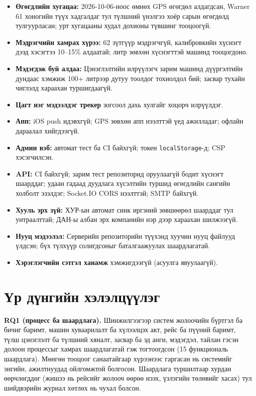 \documentclass[
12pt,
oneside,
english,
onehalfspacing,
nolistspacing,
headsepline,
]{MUST-Thesis}
\begin{document}
\begin{itemize}
    \item \textbf{Өгөгдлийн хугацаа:} 2026-10-06-ноос өмнөх GPS өгөгдөл алдагдсан, Warner 61 хоногийн түүх хадгалдаг тул түлшний үнэлгээ хоёр сарын өгөгдөлд тулгуурласан; урт хугацааны худал дохионы түвшинг тооцоогүй.
    \item \textbf{Мэдрэгчийн хамрах хүрээ:} 62 зүтгүүр мэдрэгчгүй, калибровкийн хүснэгт дээд хэсэгтээ 10--15\% алдаатай; литр зөвхөн хүснэгттэй машинд тооцогдоно.
    \item \textbf{Мэдэгдэж буй алдаа:} Цэнэглэлтийн илрүүлэгч зарим машинд дүүргэлтийн дундаас хэмжиж 100+ литрээр дутуу тоолдог тохиолдол бий; засвар тухайн чиглэлд хараахан туршигдаагүй.
    \item \textbf{Цагт нэг мэдээлдэг трекер} зогсоол дахь хулгайг хоцорч илрүүлдэг.
    \item \textbf{Апп:} iOS push идэвхгүй; GPS зөвхөн апп нээлттэй үед ажилладаг; офлайн дараалал хийгдээгүй.
    \item \textbf{Админ вэб:} автомат тест ба CI байхгүй; токен \texttt{localStorage}-д; CSP хэсэгчилсэн.
    \item \textbf{API:} CI байхгүй; зарим тест репозиторид оруулаагүй бодит хүснэгт шаарддаг; удаан гадаад дуудлага хүсэлтийн туршид өгөгдлийн сангийн холболт эзэлдэг; Socket.IO CORS нээлттэй; SMTP байхгүй.
    \item \textbf{Хууль эрх зүй:} ХУР-ын автомат синк иргэний зөвшөөрөл шаарддаг тул унтраалттай; ДАН-ы албан эрх компанийн нэр дээр хараахан шилжээгүй.
    \item \textbf{Нууц мэдээлэл:} Серверийн репозиторийн түүхэнд хуучин нууц файлууд үлдсэн; бүх түлхүүр солигдсоныг баталгаажуулах шаардлагатай.
    \item \textbf{Хэрэглэгчийн сэтгэл ханамж} хэмжигдээгүй (асуулга явуулаагүй).
\end{itemize}

\section{Үр дүнгийн хэлэлцүүлэг}

\textbf{RQ1 (процесс ба шаардлага).} Шинжилгээгээр систем жолоочийн бүртгэл ба бичиг баримт, машин хуваарилалт ба хүлээлцэх акт, рейс ба пүүний баримт, түлш цэнэглэлт ба түлшний хяналт, засвар ба эд анги, мэдэгдэл, тайлан гэсэн долоон процессыг хамрах шаардлагатай гэж тогтоогдсон (15 функциональ шаардлага). Мөнгөн тооцоог санаатайгаар хүрээнээс гаргасан нь системийг энгийн, ажилтнуудад ойлгомжтой болгосон. Шаардлага туршилтаар хурдан өөрчлөгддөг (жишээ нь рейсийг жолооч өөрөө нээх, үзлэгийн төлөвийг хасах) тул шийдвэрийн журнал хөтлөх нь чухал болсон.
\end{document}
